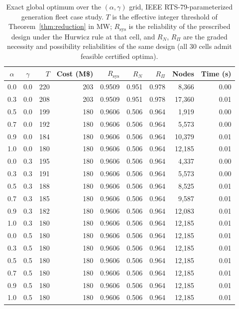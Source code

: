 \begin{table}[!htbp]
\centering
\caption{Exact global optimum over the $(\alpha,\gamma)$ grid, IEEE RTS-79-parameterized generation fleet case study. $T$ is the effective integer threshold of Theorem~\ref{thm:reduction} in MW; $R_{\mathrm{sys}}$ is the reliability of the prescribed design under the Hurwicz rule at that cell, and $R_N$, $R_\Pi$ are the graded necessity and possibility reliabilities of the same design (all 30 cells admit feasible certified optima).}
\label{tab:power_rts_stats}
\small
\begin{tabular}{ccrrrrrrr}
\hline
$\alpha$ & $\gamma$ & $T$ & Cost (M\$) & $R_{\mathrm{sys}}$ & $R_N$ & $R_\Pi$ & Nodes & Time (s)\\
\hline
0.0 & 0.0 & 220 & 203 & 0.9509 & 0.951 & 0.978 & 8,366 & 0.00 \\
0.3 & 0.0 & 208 & 203 & 0.9509 & 0.951 & 0.978 & 17,360 & 0.01 \\
0.5 & 0.0 & 199 & 180 & 0.9606 & 0.506 & 0.964 & 1,919 & 0.00 \\
0.7 & 0.0 & 192 & 180 & 0.9606 & 0.506 & 0.964 & 5,573 & 0.00 \\
0.9 & 0.0 & 184 & 180 & 0.9606 & 0.506 & 0.964 & 10,379 & 0.01 \\
1.0 & 0.0 & 180 & 180 & 0.9606 & 0.506 & 0.964 & 12,185 & 0.01 \\
\hline
0.0 & 0.3 & 195 & 180 & 0.9606 & 0.506 & 0.964 & 4,337 & 0.00 \\
0.3 & 0.3 & 191 & 180 & 0.9606 & 0.506 & 0.964 & 5,573 & 0.00 \\
0.5 & 0.3 & 188 & 180 & 0.9606 & 0.506 & 0.964 & 8,525 & 0.01 \\
0.7 & 0.3 & 185 & 180 & 0.9606 & 0.506 & 0.964 & 9,587 & 0.01 \\
0.9 & 0.3 & 182 & 180 & 0.9606 & 0.506 & 0.964 & 12,083 & 0.01 \\
1.0 & 0.3 & 180 & 180 & 0.9606 & 0.506 & 0.964 & 12,185 & 0.01 \\
\hline
0.0 & 0.5 & 180 & 180 & 0.9606 & 0.506 & 0.964 & 12,185 & 0.01 \\
0.3 & 0.5 & 180 & 180 & 0.9606 & 0.506 & 0.964 & 12,185 & 0.01 \\
0.5 & 0.5 & 180 & 180 & 0.9606 & 0.506 & 0.964 & 12,185 & 0.01 \\
0.7 & 0.5 & 180 & 180 & 0.9606 & 0.506 & 0.964 & 12,185 & 0.01 \\
0.9 & 0.5 & 180 & 180 & 0.9606 & 0.506 & 0.964 & 12,185 & 0.01 \\
1.0 & 0.5 & 180 & 180 & 0.9606 & 0.506 & 0.964 & 12,185 & 0.01 \\

\end{tabular}
\end{table}
